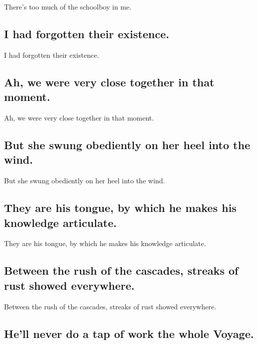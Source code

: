 \documentclass[]{article}
\begin{document}
There's too much of the schoolboy in me.

\hypertarget{i-had-forgotten-their-existence.}{%
\subsection{I had forgotten their
existence.}\label{i-had-forgotten-their-existence.}}

I had forgotten their existence.

\hypertarget{ah-we-were-very-close-together-in-that-moment.}{%
\subsection{Ah, we were very close together in that
moment.}\label{ah-we-were-very-close-together-in-that-moment.}}

Ah, we were very close together in that moment.

\hypertarget{but-she-swung-obediently-on-her-heel-into-the-wind.}{%
\subsection{But she swung obediently on her heel into the
wind.}\label{but-she-swung-obediently-on-her-heel-into-the-wind.}}

But she swung obediently on her heel into the wind.

\hypertarget{they-are-his-tongue-by-which-he-makes-his-knowledge-articulate.}{%
\subsection{They are his tongue, by which he makes his knowledge
articulate.}\label{they-are-his-tongue-by-which-he-makes-his-knowledge-articulate.}}

They are his tongue, by which he makes his knowledge articulate.

\hypertarget{between-the-rush-of-the-cascades-streaks-of-rust-showed-everywhere.}{%
\subsection{Between the rush of the cascades, streaks of rust showed
everywhere.}\label{between-the-rush-of-the-cascades-streaks-of-rust-showed-everywhere.}}

Between the rush of the cascades, streaks of rust showed everywhere.

\hypertarget{hell-never-do-a-tap-of-work-the-whole-voyage.}{%
\subsection{He'll never do a tap of work the whole
Voyage.}\label{hell-never-do-a-tap-of-work-the-whole-voyage.}}
\end{document}
